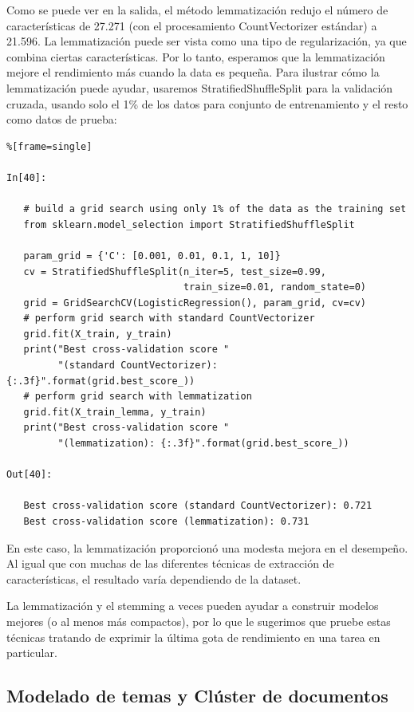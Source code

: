 \noindent Como se puede ver en la salida, el método lemmatización redujo el número de 
características de 27.271 (con el procesamiento {\ttfamily CountVectorizer estándar}) 
a 21.596. La lemmatización puede ser vista como una tipo de regularización, ya que combina
 ciertas características.
 Por lo tanto, esperamos que la lemmatización mejore el rendimiento más cuando la data es pequeña.
 Para ilustrar cómo la lemmatización puede ayudar, usaremos {\ttfamily StratifiedShuffleSplit} para la validación cruzada, usando solo el 1\% de los datos para conjunto de entrenamiento y el resto como datos de prueba:

\begin{lstlisting}%[frame=single]

In[40]:

   # build a grid search using only 1% of the data as the training set
   from sklearn.model_selection import StratifiedShuffleSplit
   
   param_grid = {'C': [0.001, 0.01, 0.1, 1, 10]}
   cv = StratifiedShuffleSplit(n_iter=5, test_size=0.99,
                               train_size=0.01, random_state=0)
   grid = GridSearchCV(LogisticRegression(), param_grid, cv=cv)
   # perform grid search with standard CountVectorizer
   grid.fit(X_train, y_train)
   print("Best cross-validation score "
         "(standard CountVectorizer): {:.3f}".format(grid.best_score_))
   # perform grid search with lemmatization
   grid.fit(X_train_lemma, y_train)
   print("Best cross-validation score "
         "(lemmatization): {:.3f}".format(grid.best_score_))

Out[40]:

   Best cross-validation score (standard CountVectorizer): 0.721
   Best cross-validation score (lemmatization): 0.731

\end{lstlisting}

En este caso, la lemmatización proporcionó una modesta mejora en el desempeño.
 Al igual que con muchas de las diferentes técnicas de extracción de características,
 el resultado varía dependiendo de la dataset. 
 
 La lemmatización y el stemming a veces  pueden ayudar a construir modelos mejores (o al menos más compactos), por lo que le   sugerimos que pruebe estas técnicas  tratando de exprimir la última gota 
  de rendimiento en una tarea en particular.

\subsection{Modelado de temas y Clúster de documentos}

